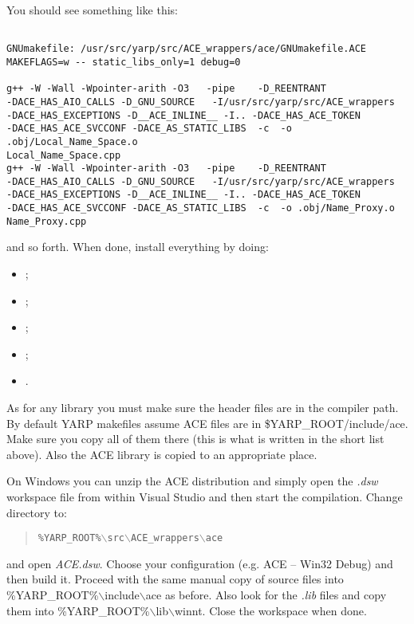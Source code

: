 You should see something like this:
\begin{verbatim}

GNUmakefile: /usr/src/yarp/src/ACE_wrappers/ace/GNUmakefile.ACE 
MAKEFLAGS=w -- static_libs_only=1 debug=0

g++ -W -Wall -Wpointer-arith -O3   -pipe    -D_REENTRANT 
-DACE_HAS_AIO_CALLS -D_GNU_SOURCE   -I/usr/src/yarp/src/ACE_wrappers 
-DACE_HAS_EXCEPTIONS -D__ACE_INLINE__ -I.. -DACE_HAS_ACE_TOKEN 
-DACE_HAS_ACE_SVCCONF -DACE_AS_STATIC_LIBS  -c  -o .obj/Local_Name_Space.o
Local_Name_Space.cpp
g++ -W -Wall -Wpointer-arith -O3   -pipe    -D_REENTRANT 
-DACE_HAS_AIO_CALLS -D_GNU_SOURCE   -I/usr/src/yarp/src/ACE_wrappers 
-DACE_HAS_EXCEPTIONS -D__ACE_INLINE__ -I.. -DACE_HAS_ACE_TOKEN 
-DACE_HAS_ACE_SVCCONF -DACE_AS_STATIC_LIBS  -c  -o .obj/Name_Proxy.o 
Name_Proxy.cpp

\end{verbatim}

and so forth. When done, install everything by doing:

\begin{itemize}
\item {};
\item {};
\item {};
\item {};
\item {}.
\end{itemize}

As for any library you must make sure the header files are in the compiler path. By default YARP makefiles assume ACE files are in \$YARP\_ROOT/include/ace. Make sure you copy all of them there (this is what is written in the short list above). Also the ACE library is copied to an appropriate place. 

On Windows you can unzip the ACE distribution and simply open the {\em .dsw} workspace file from within Visual Studio and then start the compilation. Change directory to:

\begin{quote}
{\tt \%YARP\_ROOT\%$\backslash$src$\backslash$ACE\_wrappers$\backslash$ace}
\end{quote}
 
\noindent and open {\em ACE.dsw}. Choose your configuration (e.g. ACE -- Win32 Debug) and then build it. Proceed with the same manual copy of source files into \%YARP\_ROOT\%$\backslash$include$\backslash$ace as before. Also look for the {\em *.lib} files and copy them into \%YARP\_ROOT\%$\backslash$lib$\backslash$winnt. Close the workspace when done.

